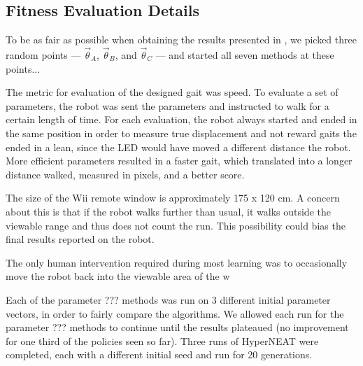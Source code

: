 \subsection{Fitness Evaluation Details}


To be as fair as possible when obtaining the results presented in
, we picked three random points --- $\vec{\theta}_A$,
$\vec{\theta}_B$, and $\vec{\theta}_C$ --- and started all seven
methods at these points...



The metric for evaluation of the designed gait was speed. To evaluate
a set of parameters, the robot was sent the parameters and instructed
to walk for a certain length of time. For each evaluation, the robot
always started and ended in the same position in order to measure true
displacement and not reward gaits the ended in a lean, since the LED
would have moved a different distance the robot. More efficient
parameters resulted in a faster gait, which translated into a longer
distance walked, measured in pixels, and a better score.

The size of the Wii remote window is approximately 175 x 120 cm. A
concern about this is that if the robot walks further than usual,
it walks outside the viewable range and thus does not count the run.
This possibility could bias the final results reported on the robot.

The only human intervention required during most learning was to
occasionally move the robot back into the viewable area of the w


Each of the parameter ??? methods was run on 3 different initial
parameter vectors, in order to fairly compare the algorithms. We allowed 
each run for the parameter ??? methods to
continue until the results plateaued (no improvement for one third of
the policies seen so far). Three runs of HyperNEAT were completed,
each with a different initial seed and run for 20 generations.
